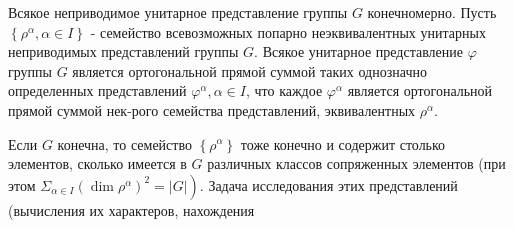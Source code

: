 \documentclass[10pt]{article}
\begin{document}
Всякое неприводимое унитарное представление группы $G$ конечномерно. Пусть $\left\{\rho^{\alpha}, \alpha \in I\right\}$ - семейство всевозможных попарно неэквивалентных унитарных неприводимых представлений группы $G$. Всякое унитарное представление $\varphi$ группы $G$ является ортогональной прямой суммой таких однозначно определенных представлений $\varphi^{\alpha}, \alpha \in I$, что каждое $\varphi^{\alpha}$ является ортогональной прямой суммой нек-рого семейства представлений, эквивалентных $\rho^{\alpha}$.



Если $G$ конечна, то семейство $\left\{\rho^{\alpha}\right\}$ тоже конечно и содержит столько элементов, сколько имеется в $G$ различных классов сопряженных элементов (при этом $\left.\Sigma_{\alpha \in I}\left(\operatorname{dim} \rho^{\alpha}\right)^{2}=|G|\right)$. Задача исследования этих представлений (вычисления их характеров, нахождения
\end{document}
